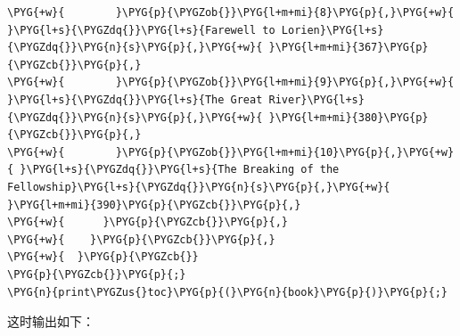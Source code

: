 \begin{codeblockbg}
\begin{Verbatim}[commandchars=\\\{\},breaklines=true,breakanywhere=true,fontsize=\codefont,xleftmargin=17bp]
\PYG{+w}{        }\PYG{p}{\PYGZob{}}\PYG{l+m+mi}{8}\PYG{p}{,}\PYG{+w}{ }\PYG{l+s}{\PYGZdq{}}\PYG{l+s}{Farewell to Lorien}\PYG{l+s}{\PYGZdq{}}\PYG{n}{s}\PYG{p}{,}\PYG{+w}{ }\PYG{l+m+mi}{367}\PYG{p}{\PYGZcb{}}\PYG{p}{,}
\PYG{+w}{        }\PYG{p}{\PYGZob{}}\PYG{l+m+mi}{9}\PYG{p}{,}\PYG{+w}{ }\PYG{l+s}{\PYGZdq{}}\PYG{l+s}{The Great River}\PYG{l+s}{\PYGZdq{}}\PYG{n}{s}\PYG{p}{,}\PYG{+w}{ }\PYG{l+m+mi}{380}\PYG{p}{\PYGZcb{}}\PYG{p}{,}
\PYG{+w}{        }\PYG{p}{\PYGZob{}}\PYG{l+m+mi}{10}\PYG{p}{,}\PYG{+w}{ }\PYG{l+s}{\PYGZdq{}}\PYG{l+s}{The Breaking of the Fellowship}\PYG{l+s}{\PYGZdq{}}\PYG{n}{s}\PYG{p}{,}\PYG{+w}{ }\PYG{l+m+mi}{390}\PYG{p}{\PYGZcb{}}\PYG{p}{,}
\PYG{+w}{      }\PYG{p}{\PYGZcb{}}\PYG{p}{,}
\PYG{+w}{    }\PYG{p}{\PYGZcb{}}\PYG{p}{,}
\PYG{+w}{  }\PYG{p}{\PYGZcb{}}
\PYG{p}{\PYGZcb{}}\PYG{p}{;}
\PYG{n}{print\PYGZus{}toc}\PYG{p}{(}\PYG{n}{book}\PYG{p}{)}\PYG{p}{;}
\end{Verbatim}
\end{codeblockbg}



这时输出如下：



